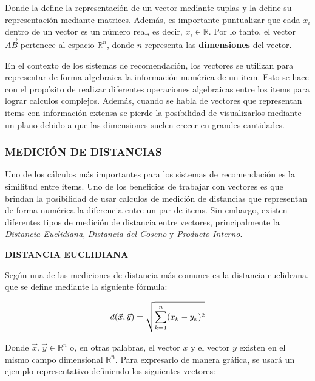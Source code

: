     Donde la  define la representación de un vector mediante tuplas y la  define su representación mediante matrices. Además, es importante puntualizar que cada $x_i$ dentro de un vector es un número real, es decir,  $x_i \in \mathbb{R}$. Por lo tanto, el vector $\vec{AB}$ pertenece al espacio $\mathbb{R}^n$, donde $n$ representa las \textbf{dimensiones} del vector.

    En el contexto de los sistemas de recomendación, los vectores se utilizan para representar de forma algebraica la información numérica de un item. Esto se hace con el propósito de realizar diferentes operaciones algebraicas entre los items para lograr calculos complejos. Además, cuando se habla de vectores que representan items con información extensa se pierde la posibilidad de visualizarlos mediante un plano debido a que las dimensiones suelen crecer en grandes cantidades.

    \newpage

    \subsubsection{MEDICIÓN DE DISTANCIAS}

    Uno de los cálculos más importantes para los sistemas de recomendación es la similitud entre items. Uno de los beneficios de trabajar con vectores es que brindan la posibilidad de usar calculos de medición de distancias que representan de forma numérica la diferencia entre un par de items. Sin embargo, existen diferentes tipos de medición de distancia entre vectores, principalmente la \textit{Distancia Euclidiana}, \textit{Distancia del Coseno} y \textit{Producto Interno}.

    \textbf{DISTANCIA EUCLIDIANA}

    Según \parencite{10.5555/1941884} una de las mediciones de distancia más comunes es la distancia euclideana, que se define mediante la siguiente fórmula:

    \begin{equation}
        d(\vec{x}, \vec{y}) = \sqrt{\sum^n_{k=1}(x_k - y_k)^2}
        \addequation{Definición de Distancia Euclideana}
    \end{equation}

    Donde $\vec{x}, \vec{y} \in \mathbb{R}^n$ o, en otras palabras, el vector $x$ y el vector $y$ existen en el mismo campo dimensional $\mathbb{R}^n$. Para expresarlo de manera gráfica, se usará un ejemplo representativo definiendo los siguientes vectores:

